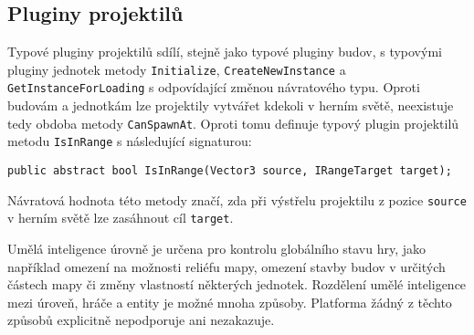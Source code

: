 \subsection{Pluginy projektilů}
Typové pluginy projektilů sdílí, stejně jako typové pluginy budov, s typovými pluginy jednotek metody \texttt{Initialize}, \texttt{CreateNewInstance} a \texttt{GetInstanceForLoading} s odpovídající změnou návratového typu. Oproti budovám a jednotkám lze projektily vytvářet kdekoli v herním světě, neexistuje tedy obdoba metody \texttt{CanSpawnAt}. Oproti tomu definuje typový plugin projektilů metodu \texttt{IsInRange} s následující signaturou:

\begin{lstlisting}
public abstract bool IsInRange(Vector3 source, IRangeTarget target);
\end{lstlisting}

Návratová hodnota této metody značí, zda při výstřelu projektilu z pozice \texttt{source} v herním světě lze zasáhnout cíl \texttt{target}.




Umělá inteligence úrovně je určena pro kontrolu globálního stavu hry, jako například omezení na možnosti reliéfu mapy, omezení stavby budov v určitých částech mapy či změny vlastností některých jednotek. Rozdělení umělé inteligence mezi úroveň, hráče a entity je možné mnoha způsoby. Platforma žádný z těchto způsobů explicitně nepodporuje ani nezakazuje.

